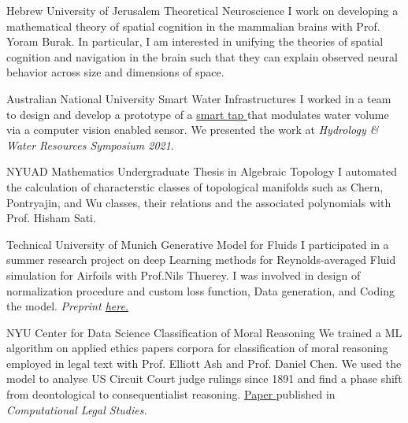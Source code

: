 
{Hebrew University of Jerusalem} {Theoretical Neuroscience}
{
	I work on developing a mathematical theory of spatial cognition in the mammalian brains with Prof. Yoram Burak. 
	In particular, I am interested in unifying the theories of spatial cognition and navigation in the brain such that 
	they can explain observed neural behavior across size and dimensions of space.
}

{Australian National University} {Smart Water Infrastructures} { I worked in a team to design and develop a prototype of
	a \href{http://tappyvision.herokuapp.com}{ smart tap }that modulates water volume via a computer vision enabled sensor.
	We presented the work at \textit{Hydrology \& Water Resources Symposium 2021}. }


{NYUAD Mathematics} {Undergraduate Thesis in Algebraic Topology} { I automated the calculation of characterstic classes
	of topological manifolds such as Chern, Pontryajin, and Wu classes, their relations and the associated polynomials with
	Prof. Hisham Sati. }

{Technical University of Munich} {Generative Model for Fluids} { I participated in a summer research project on deep
	Learning methods for Reynolds-averaged Fluid simulation for Airfoils with Prof.Nils Thuerey. I was involved in design of
	normalization procedure and custom loss function, Data generation, and Coding the model. \textit{ Preprint
		\href{https://www.researchgate.net/publication/328418525_Well_how_accurate_is_it_A_Study_of_Deep_Learning_Methods_for_Reynolds-Averaged_Navier-Stokes_Simulations}{
			here. } } }

{NYU Center for Data Science} {Classification of Moral Reasoning} { We trained a ML algorithm on applied ethics papers
	corpora for classification of moral reasoning employed in legal text with Prof. Elliott Ash and Prof. Daniel Chen. We
	used the model to analyse US Circuit Court judge rulings since 1891 and find a phase shift from deontological to
	consequentialist reasoning. \href{https://papers.ssrn.com/sol3/papers.cfm?abstract_id=3205286}{ Paper }published in
	\textit{Computational Legal Studies.} }
